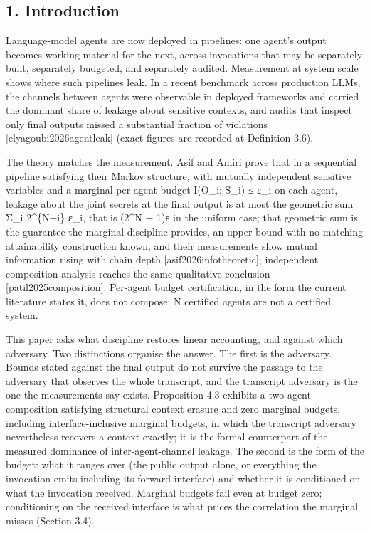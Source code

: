 \documentclass[
  11pt,
]{article}
\begin{document}
\subsection{1. Introduction}\label{introduction}

Language-model agents are now deployed in pipelines: one agent's output
becomes working material for the next, across invocations that may be
separately built, separately budgeted, and separately audited.
Measurement at system scale shows where such pipelines leak. In a recent
benchmark across production LLMs, the channels between agents were
observable in deployed frameworks and carried the dominant share of
leakage about sensitive contexts, and audits that inspect only final
outputs missed a substantial fraction of violations
{[}elyagoubi2026agentleak{]} (exact figures are recorded at Definition
3.6).

The theory matches the measurement. Asif and Amiri prove that in a
sequential pipeline satisfying their Markov structure, with mutually
independent sensitive variables and a marginal per-agent budget I(O\_i;
S\_i) ≤ ε\_i on each agent, leakage about the joint secrets at the final
output is at most the geometric sum Σ\_i 2\^{}\{N−i\} ε\_i, that is
(2\^{}N − 1)ε in the uniform case; that geometric sum is the guarantee
the marginal discipline provides, an upper bound with no matching
attainability construction known, and their measurements show mutual
information rising with chain depth {[}asif2026infotheoretic{]};
independent composition analysis reaches the same qualitative conclusion
{[}patil2025composition{]}. Per-agent budget certification, in the form
the current literature states it, does not compose: N certified agents
are not a certified system.

This paper asks what discipline restores linear accounting, and against
which adversary. Two distinctions organise the answer. The first is the
adversary. Bounds stated against the final output do not survive the
passage to the adversary that observes the whole transcript, and the
transcript adversary is the one the measurements say exists. Proposition
4.3 exhibits a two-agent composition satisfying structural context
erasure and zero marginal budgets, including interface-inclusive
marginal budgets, in which the transcript adversary nevertheless
recovers a context exactly; it is the formal counterpart of the measured
dominance of inter-agent-channel leakage. The second is the form of the
budget: what it ranges over (the public output alone, or everything the
invocation emits including its forward interface) and whether it is
conditioned on what the invocation received. Marginal budgets fail even
at budget zero; conditioning on the received interface is what prices
the correlation the marginal misses (Section 3.4).
\end{document}
